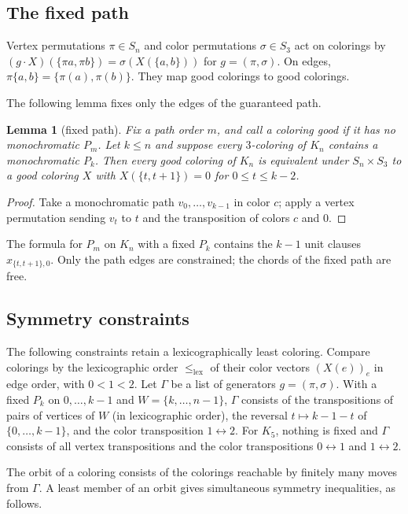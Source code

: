 \documentclass[11pt]{article}
\newtheorem{lemma}[theorem]{Lemma}
\theoremstyle{definition}
\theoremstyle{remark}
\newcommand{\lex}{\le_{\mathrm{lex}}}
\begin{document}
\subsection{The fixed path}
Vertex permutations $\pi\in S_n$ and color permutations $\sigma\in S_3$ act
on colorings by $(g\cdot X)(\{\pi a,\pi b\})=\sigma(X(\{a,b\}))$ for
$g=(\pi,\sigma)$. On edges, $\pi\{a,b\}=\{\pi(a),\pi(b)\}$. They map good colorings to good colorings.

The following lemma fixes only the edges of the guaranteed path.

\begin{lemma}[fixed path]\label{lem:fix}
Fix a path order $m$, and call a coloring good if it has no monochromatic
$P_m$. Let $k\le n$ and suppose every $3$-coloring of $K_n$ contains a
monochromatic $P_k$. Then every good coloring of $K_n$ is equivalent under
$S_n\times S_3$ to a good coloring $X$ with $X(\{t,t+1\})=0$ for
$0\le t\le k-2$.
\end{lemma}

\begin{proof}
Take a monochromatic path $v_0,\dots,v_{k-1}$ in color $c$; apply a vertex
permutation sending $v_t$ to $t$ and the transposition of colors $c$ and
$0$.
\end{proof}

The formula for $P_m$ on $K_n$ with a fixed $P_k$ contains
the $k-1$ unit clauses $x_{\{t,t+1\},0}$. Only the path edges are
constrained; the chords of the fixed path are free.

\subsection{Symmetry constraints}
The following constraints retain a lexicographically least coloring.
Compare colorings by the lexicographic order $\lex$ of their color vectors
$(X(e))_{e}$ in edge order, with $0<1<2$. Let $\Gamma$ be a list of
generators $g=(\pi,\sigma)$. With a fixed $P_k$ on $0,\dots,k-1$ and
$W=\{k,\dots,n-1\}$, $\Gamma$ consists of the transpositions of pairs of
vertices of $W$ (in lexicographic order), the reversal $t\mapsto k-1-t$ of
$\{0,\dots,k-1\}$, and the color transposition $1\leftrightarrow2$. For $K_5$, nothing is fixed and $\Gamma$ consists of all vertex
transpositions and the color transpositions $0\leftrightarrow1$ and
$1\leftrightarrow2$.

The orbit of a coloring consists of the colorings reachable by finitely
many moves from $\Gamma$. A least member of an orbit gives simultaneous
symmetry inequalities, as follows.
\end{document}
